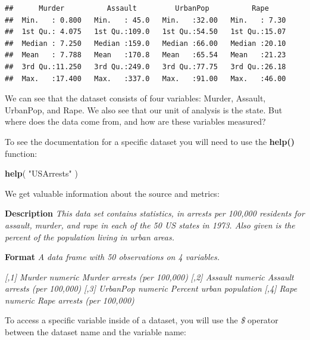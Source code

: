 \documentclass[]{book}
\newenvironment{Shaded}{\begin{snugshade}}{\end{snugshade}}
\newcommand{\KeywordTok}[1]{\textcolor[rgb]{0.13,0.29,0.53}{\textbf{#1}}}
\newcommand{\NormalTok}[1]{#1}
\newcommand{\OperatorTok}[1]{\textcolor[rgb]{0.81,0.36,0.00}{\textbf{#1}}}
\newcommand{\StringTok}[1]{\textcolor[rgb]{0.31,0.60,0.02}{#1}}
\theoremstyle{definition}
\theoremstyle{definition}
\theoremstyle{definition}
\theoremstyle{remark}
\begin{document}
\begin{verbatim}
##      Murder          Assault         UrbanPop          Rape      
##  Min.   : 0.800   Min.   : 45.0   Min.   :32.00   Min.   : 7.30  
##  1st Qu.: 4.075   1st Qu.:109.0   1st Qu.:54.50   1st Qu.:15.07  
##  Median : 7.250   Median :159.0   Median :66.00   Median :20.10  
##  Mean   : 7.788   Mean   :170.8   Mean   :65.54   Mean   :21.23  
##  3rd Qu.:11.250   3rd Qu.:249.0   3rd Qu.:77.75   3rd Qu.:26.18  
##  Max.   :17.400   Max.   :337.0   Max.   :91.00   Max.   :46.00
\end{verbatim}

We can see that the dataset consists of four variables: Murder, Assault,
UrbanPop, and Rape. We also see that our unit of analysis is the state.
But where does the data come from, and how are these variables measured?

To see the documentation for a specific dataset you will need to use the
\textbf{help()} function:

\begin{Shaded}
\begin{Highlighting}[]
\KeywordTok{help}\NormalTok{( }\StringTok{"USArrests"}\NormalTok{ )}
\end{Highlighting}
\end{Shaded}

We get valuable information about the source and metrics:

\textbf{Description} \emph{This data set contains statistics, in arrests
per 100,000 residents for assault, murder, and rape in each of the 50 US
states in 1973. Also given is the percent of the population living in
urban areas.}

\textbf{Format} \emph{A data frame with 50 observations on 4 variables.}

\emph{{[},1{]} Murder numeric Murder arrests (per 100,000)}
\emph{{[},2{]} Assault numeric Assault arrests (per 100,000)}
\emph{{[},3{]} UrbanPop numeric Percent urban population} \emph{{[},4{]}
Rape numeric Rape arrests (per 100,000)}

To access a specific variable inside of a dataset, you will use the
\emph{\$} operator between the dataset name and the variable name:

\begin{Shaded}
\end{Shaded}
\end{document}
